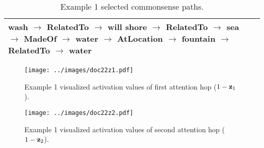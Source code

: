 \documentclass[11pt,a4paper]{article}
\begin{document}
\begin{table*}[!b]
\begin{small}
\begin{tabular}{|p{}|p{}|}
{wash $\rightarrow$ RelatedTo $\rightarrow$ will\\
shore $\rightarrow$ RelatedTo $\rightarrow$ sea $\rightarrow$ MadeOf $\rightarrow$ water $\rightarrow$ AtLocation $\rightarrow$ fountain $\rightarrow$ RelatedTo $\rightarrow$ water
    } \\
    \hline
  \end{tabular}
 \caption{Example 1 selected commonsense paths.}
 \label{tab:extractedex1}
\end{small}

\end{table*}

\begin{figure*}[h]
  \centering
  \texttt{[image: ../images/doc22z1.pdf]}
 \caption{Example 1 visualized activation values of first attention hop ($1 - {\bf z}_1$).}
\end{figure*}
\begin{figure*}[h]
  \centering
  \texttt{[image: ../images/doc22z2.pdf]}
 \caption{Example 1 visualized activation values of second attention hop ($1 - {\bf z}_2$).}
\end{figure*}
\end{document}
